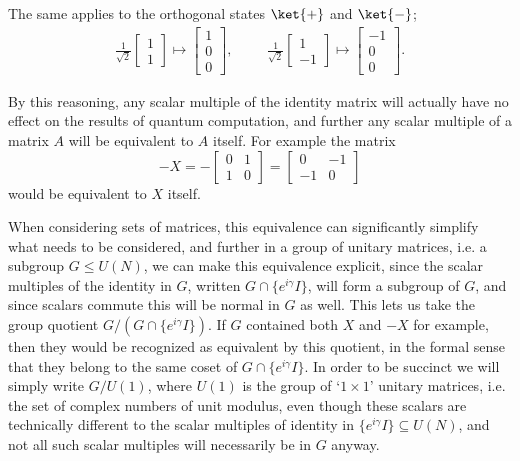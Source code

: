 The same applies to the orthogonal states $\ket{+}$ and $\ket{-}$;
\begin{align*}
	\frac{1}{\sqrt{2}}\begin{bmatrix}1 \\ 1\end{bmatrix} \mapsto \begin{bmatrix}1\\0\\0\end{bmatrix},
	&&&
	\frac{1}{\sqrt{2}}\begin{bmatrix}1 \\ -1\end{bmatrix} \mapsto \begin{bmatrix}-1\\0\\0\end{bmatrix}.
\end{align*}

By this reasoning, any scalar multiple of the identity matrix will actually have no effect on the results of quantum computation, and further any scalar multiple of a matrix $A$ will be equivalent to $A$ itself. For example the matrix
\[-X = -\left[\begin{matrix}0 & 1 \\ 1 & 0\end{matrix}\right]= \left[\begin{matrix}0 & -1 \\ -1 & 0\end{matrix}\right]\]
would be equivalent to $X$ itself.

When considering sets of matrices, this equivalence can significantly simplify what needs to be considered, and further in a group of unitary matrices, i.e. a subgroup $G \leq U(N)$, we can make this equivalence explicit, since the scalar multiples of the identity in $G$, written $G \cap \{e^{i\gamma}I\}$, will form a subgroup of $G$, and since scalars commute this will be normal in $G$ as well. This lets us take the group quotient $G / (G \cap \{e^{i\gamma}I\})$. If $G$ contained both $X$ and $-X$ for example, then they would be recognized as equivalent by this quotient, in the formal sense that they belong to the same coset of $G \cap \{e^{i\gamma}I\}$. In order to be succinct we will simply write $G / U(1)$, where $U(1)$ is the group of `$1 \times 1$' unitary matrices, i.e. the set of complex numbers of unit modulus, even though these scalars are technically different to the scalar multiples of identity in $\{e^{i\gamma}I\} \subseteq U(N)$, and not all such scalar multiples will necessarily be in $G$ anyway.

